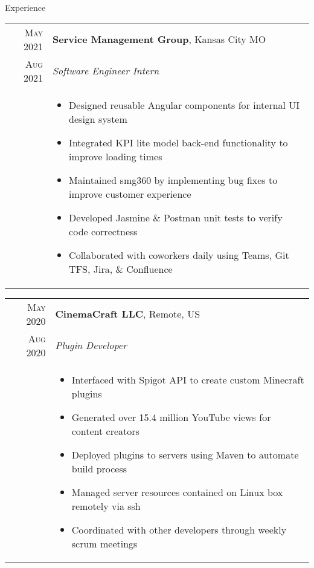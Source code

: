 \documentclass{resume}
\begin{document}
\begin{rSection}{Experience}
\small
{
  \begin{tabular}{r|p{15cm}}
    \textsc{May 2021} & \textbf{Service Management Group}, Kansas City MO \\
    \textsc{Aug 2021}  & \textit{Software Engineer Intern} \\ &
    \begin{itemize}
      \item {Designed reusable Angular components for internal UI design system}
      \item {Integrated KPI lite model back-end functionality to improve loading times}
      \item {Maintained smg360 by implementing bug fixes to improve customer experience}
      \item {Developed Jasmine \& Postman unit tests to verify code correctness}
      \item {Collaborated with coworkers daily using Teams, Git TFS, Jira, \& Confluence}
    \end{itemize}
  \end{tabular}
  
  \begin{tabular}{r|p{15cm}}
    \textsc{May 2020} & \textbf{CinemaCraft LLC}, Remote, US \\
    \textsc{Aug 2020}  & \textit{Plugin Developer} \\ &
    \begin{itemize}
      \item {Interfaced with Spigot API to create custom Minecraft plugins}
      \item {Generated over 15.4 million YouTube views for content creators}
      \item {Deployed plugins to servers using Maven to automate build process}
      \item {Managed server resources contained on Linux box remotely via ssh}
      \item {Coordinated with other developers through weekly scrum meetings}
    \end{itemize}
  \end{tabular}
  
}
\end{rSection}
\end{document}
